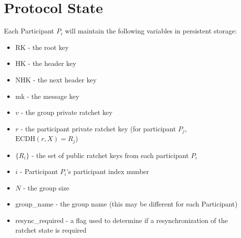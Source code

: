 \documentclass[%
preprint,
amsmath,amssymb,
aps,
prb,
floatfix,
]{revtex4-1}
\begin{document}
\section{\label{sec:protocolstate}Protocol State}
Each Participant $P_i$ will maintain the following variables in persistent
storage:
\begin{itemize}
\item RK - the root key
\item HK - the header key
\item NHK - the next header key
\item mk - the message key
\item $v$ - the group private ratchet key
\item $r$ - the participant private ratchet key (for participant $P_j$,
$\mathrm{ECDH}(r, X) = R_j$)
\item $\{R_i\}$ - the set of public ratchet keys from each participant $P_i$
\item $i$ - Participant $P_i$'s participant index number
\item $N$ - the group size
\item group\_name - the group name (this may be different for each Participant)
\item resync\_required - a flag used to determine if a resynchronization of the
ratchet state is required
\end{itemize}
\end{document}
